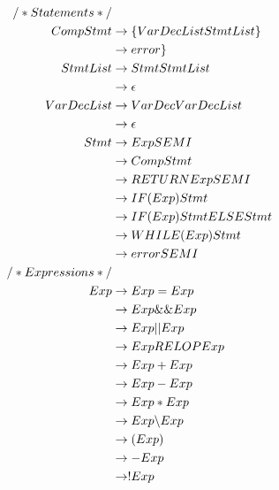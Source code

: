 \begin{alignat*}{8}
    /* Statements */\\
    CompStmt    &\rightarrow \space \{ \space VarDecList \space StmtList \space \}\\
                &\rightarrow \space error \space \}\\
    StmtList    &\rightarrow \space Stmt \space StmtList\\
                &\rightarrow \space \epsilon\\
    VarDecList  &\rightarrow \space VarDec \space VarDecList\\
                &\rightarrow \space \epsilon\\
    Stmt        &\rightarrow \space Exp \space SEMI\\
                &\rightarrow \space CompStmt\\
                &\rightarrow \space RETURN \space Exp \space SEMI\\
                &\rightarrow \space IF \space ( \space Exp \space ) \space Stmt\\
                &\rightarrow \space IF \space ( \space Exp \space ) \space Stmt \space ELSE \space Stmt\\
                &\rightarrow \space WHILE \space ( \space Exp \space ) \space Stmt\\
                &\rightarrow \space error \space SEMI\\
    /* Expressions */\\
    Exp         &\rightarrow \space Exp \space = \space Exp\\
                &\rightarrow \space Exp \space \&\& \space Exp\\
                &\rightarrow \space Exp \space || \space Exp\\
                &\rightarrow \space Exp \space RELOP \space Exp\\
                &\rightarrow \space Exp \space + \space Exp\\
                &\rightarrow \space Exp \space - \space Exp\\
                &\rightarrow \space Exp \space * \space Exp\\
                &\rightarrow \space Exp \space \backslash \space Exp\\
                &\rightarrow \space ( \space Exp \space )\\
                &\rightarrow \space - \space Exp\\
                &\rightarrow \space ! \space Exp\\

\end{alignat*}
